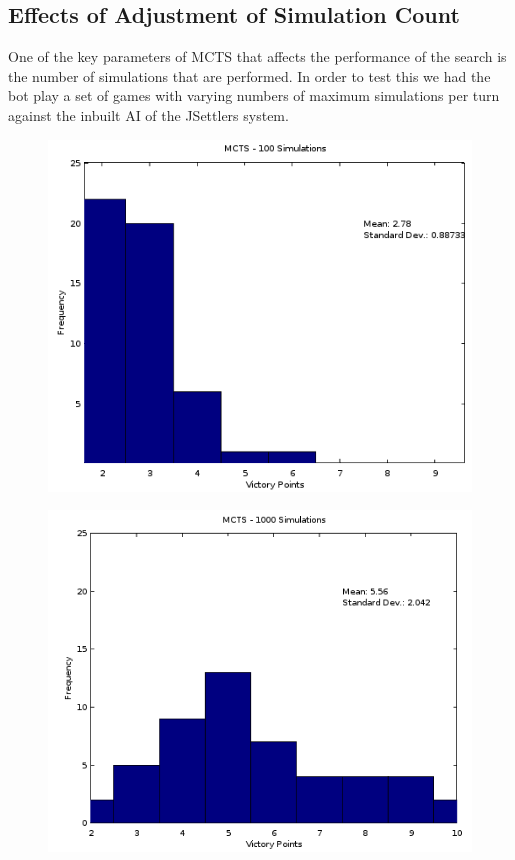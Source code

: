 \documentclass[]{article}
\begin{document}
\subsection{Effects of Adjustment of Simulation Count}

One of the key parameters of MCTS that affects the performance of the search is the number of simulations that are performed. In order to test this we had the bot play a set of games with varying numbers of maximum simulations per turn against the inbuilt AI of the JSettlers system. 

\begin{center}

\begin{figure}[H]
\centering
\begin{minipage}{.5\textwidth}
  \centering
  \includegraphics[width=.9\linewidth]{figures/mcts100}
  \label{fig:mcts100}
\end{minipage}%
\begin{minipage}{.5\textwidth}
  \centering
  \includegraphics[width=.9\linewidth]{figures/mcts1000}
  \label{fig:mcts1000}
\end{minipage}
\end{figure}


\end{center}
\end{document}

